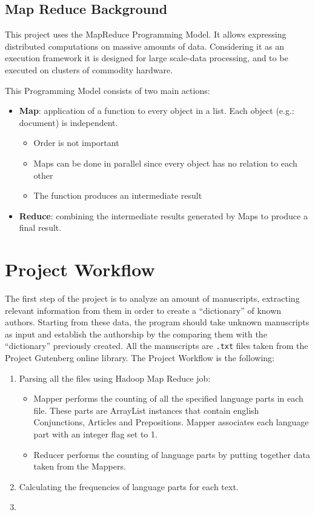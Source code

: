 \documentclass[a4paper]{article}
\begin{document}
	\subsection{Map Reduce Background}

		This project uses the MapReduce Programming Model. It allows expressing distributed computations on massive amounts of data. Considering it as an execution framework it is designed for large scale-data processing, and to be executed on clusters of commodity hardware.

		\bigskip

		\noindent
		This Programming Model consists of two main actions:
		\begin{itemize}
			\item \textbf{Map}: application of a function to every object in a list. Each object (e.g.: document) is independent.
			\begin{itemize}
				\item Order is not important
				\item Maps can be done in parallel since every object has no relation to each other
				\item The function produces an intermediate result
			\end{itemize}
			\item \textbf{Reduce}: combining the intermediate results generated by Maps to produce a final result.
		\end{itemize}

	\section{Project Workflow}

	The first step of the project is to analyze an amount of manuscripts, extracting relevant information from them in order to create a ``dictionary'' of known authors. Starting from these data, the program should take unknown manuscripts as input and establish the authorship by the comparing them with the ``dictionary'' previously created. All the manuscripts are \texttt{.txt} files taken from the Project Gutenberg\parencite{Gutenberg} online library.
	The Project Workflow is the following:
	\begin{enumerate}
		\item Parsing all the files using Hadoop Map Reduce job: 
		\begin{itemize}
			\item Mapper performs the counting of all the specified language parts in each file. These parts are ArrayList instances that contain english Conjunctions, Articles and Prepositions. Mapper associates each language part with an integer flag set to 1.
			\item Reducer performs the counting of language parts by putting together data taken from the Mappers. 
		\end{itemize}
		\item Calculating the frequencies of language parts for each text.
		\item 
	\end{enumerate}
\end{document}
